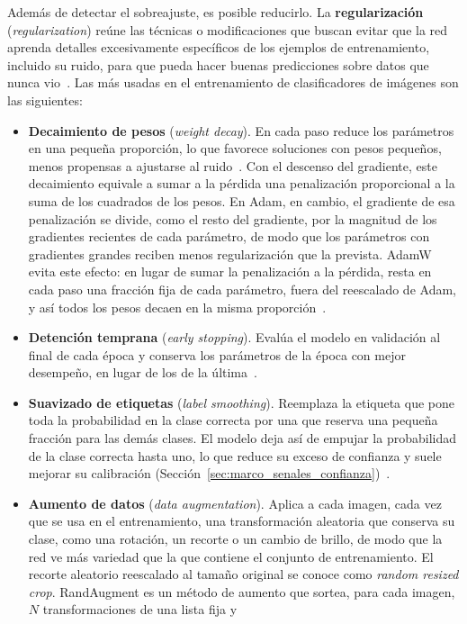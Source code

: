 Además de detectar el sobreajuste, es posible reducirlo. La \textbf{regularización} (\emph{regularization})
reúne las técnicas o modificaciones que buscan evitar que la red aprenda detalles excesivamente específicos de los ejemplos de
entrenamiento, incluido su ruido, para que pueda hacer buenas predicciones sobre datos que nunca
vio~\cite{goodfellow2016deep}. Las más usadas en el entrenamiento de clasificadores de imágenes son las
siguientes:
\begin{itemize}
    \item \textbf{Decaimiento de pesos} (\emph{weight decay}). En cada paso reduce los parámetros en una pequeña
    proporción, lo que favorece soluciones con pesos pequeños, menos propensas a ajustarse al
    ruido~\cite{goodfellow2016deep}. Con el descenso del gradiente, este decaimiento equivale a sumar a la
    pérdida una penalización proporcional a la suma de los cuadrados de los pesos. En Adam, en cambio, el
    gradiente de esa penalización se divide, como el resto del gradiente, por la magnitud de los gradientes
    recientes de cada parámetro, de modo que los parámetros con gradientes grandes reciben menos
    regularización que la prevista. AdamW evita este efecto: en lugar de sumar la penalización a la pérdida,
    resta en cada paso una fracción fija de cada parámetro, fuera del reescalado de Adam, y así todos los pesos
    decaen en la misma proporción~\cite{loshchilov2019decoupled}.
    \item \textbf{Detención temprana} (\emph{early stopping}). Evalúa el modelo en validación al final de cada
    época y conserva los parámetros de la época con mejor desempeño, en lugar de los de la
    última~\cite{goodfellow2016deep}.
    \item \textbf{Suavizado de etiquetas} (\emph{label smoothing}). Reemplaza la etiqueta que pone toda la
    probabilidad en la clase correcta por una que reserva una pequeña fracción para las demás clases. El modelo
    deja así de empujar la probabilidad de la clase correcta hasta uno, lo que reduce su exceso de confianza y
    suele mejorar su calibración (Sección~\ref{sec:marco_senales_confianza})~\cite{szegedy2016rethinking,muller2019does}.
    \item \textbf{Aumento de datos} (\emph{data augmentation}). Aplica a cada imagen, cada vez que se usa en el
    entrenamiento, una transformación aleatoria que conserva su clase, como una rotación, un recorte o un
    cambio de brillo, de modo que la red ve más variedad que la que contiene el conjunto de entrenamiento.
    El recorte aleatorio reescalado al tamaño original se conoce como \emph{random resized crop}. RandAugment es un método de aumento que sortea, para cada imagen, $N$ transformaciones de una lista fija y

\end{itemize}
